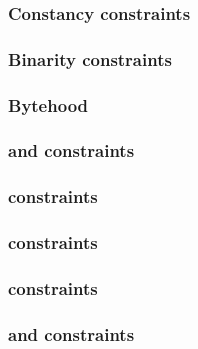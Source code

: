 \subsubsection{Constancy constraints}                                                           \label{rom: generalities: constancies}                  
\subsubsection{Binarity constraints}                                                            \label{rom: generalities: binarities}                   
\subsubsection{Bytehood}                                                                        \label{rom: generalities: bytehood}                     
\subsubsection{\flagSum{} and \weightedFlagSum{} constraints}                                   \label{rom: generalities: flag sum constraints}         
\subsubsection{\romColumnCfiMax{} constraints}                                                  \label{rom: generalities: cfi max constraints}          
\subsubsection{\cfi{} constraints}                                                              \label{rom: generalities: cfi constraints}              
\subsubsection{\done{} constraints}                                                             \label{rom: generalities: done constraints}             
\subsubsection{\romColumnEmptyCode{} and \romColumnNonemptyCode{} constraints}                  \label{rom: generalities: empty and nonempty code}      
